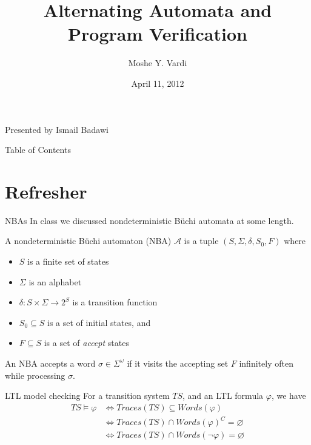 \documentclass{beamer}
\title[Alternating Automata]{Alternating Automata and Program Verification \nocite{Vardi::95}}
\date{April 11, 2012}
\author[Moshe Y. Vardi]{Moshe Y. Vardi}
\begin{document}


\begin{frame}
\titlepage
\begin{center}
Presented by Ismail Badawi
\end{center}
\end{frame}

\begin{frame}{Table of Contents}
\tableofcontents
\end{frame}

\section{Refresher}

\begin{frame}{NBAs}
In class we discussed nondeterministic B\"{u}chi automata at some length.

A nondeterministic B\"{u}chi automaton (NBA) $\mathcal{A}$ is a tuple
$(S, \Sigma, \delta, S_0, F)$ where
    \begin{itemize}
    \item $S$ is a finite set of states
    \item $\Sigma$ is an alphabet
    \item $\delta: S \times \Sigma \rightarrow 2^S$ is a transition function
    \item $S_0 \subseteq S$ is a set of initial states, and
    \item $F \subseteq S$ is a set of \emph{accept} states
    \end{itemize}
An NBA accepts a word $\sigma \in \Sigma^\omega$ if it visits the accepting
set $F$ infinitely often while processing $\sigma$.
\end{frame}

\begin{frame}{LTL model checking}
For a transition system $TS$, and an LTL formula $\varphi$, we have
\begin{align*}
TS \models \varphi &\iff Traces(TS) \subseteq Words(\varphi) \\
&\iff Traces(TS) \cap Words(\varphi)^C = \varnothing \\
&\iff Traces(TS) \cap Words(\neg \varphi) = \varnothing
\end{align*}
\end{frame}
\end{document}
